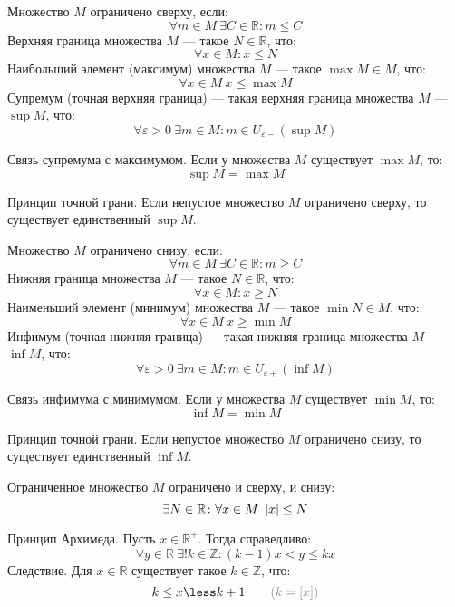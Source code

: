 Множество $M$ {\bold ограничено сверху}, если:
$$\forall m\in M\ \exists C\in\mathbb{R}\colon m\leq C$$
{\bold Верхняя граница} множества $M$ --- такое $N\in\mathbb{R}$, что:
$$\forall x\in M\colon x\leq N$$
{\bold Наибольший элемент} {\ital (максимум)} множества $M$ --- такое $\max M\in M$, что:
$$\forall x\in M\ x\leq\max M$$
{\bold Супремум} {\ital (точная верхняя граница)} --- такая верхняя граница множества $M$ --- $\sup M$, что:
$$\forall\varepsilon\greater 0\ \exists m\in M\colon m\in U_{\varepsilon-}(\sup M)$$
\begin{theorem}
{\bold Связь супремума с максимумом.} Если у множества $M$ существует $\max M$, то:
$$\sup M=\max M$$ 
\end{theorem}
\begin{theorem}
{\bold Принцип точной грани.} Если непустое множество $M$ ограничено сверху, то существует {\ital единственный} $\sup M$.
\end{theorem}
Множество $M$ {\bold ограничено снизу}, если:
$$\forall m\in M\ \exists C\in\mathbb{R}\colon m\geq C$$
{\bold Нижняя граница} множества $M$ --- такое $N\in\mathbb{R}$, что:
$$\forall x\in M\colon x\geq N$$
{\bold Наименьший элемент} {\ital (минимум)} множества $M$ --- такое $\min N\in M$, что:
$$\forall x\in M\ x\geq\min M$$
{\bold Инфимум} {\ital (точная нижняя граница)} --- такая нижняя граница множества $M$ --- $\inf M$, что:
$$\forall\varepsilon\greater 0\ \exists m\in M\colon m\in U_{\varepsilon+}(\inf M)$$
\begin{theorem}
{\bold Связь инфимума с минимумом.} Если у множества $M$ существует $\min M$, то:
$$\inf M=\min M$$ 
\end{theorem}
\begin{theorem}
{\bold Принцип точной грани.} Если непустое множество $M$ ограничено снизу, то существует {\ital единственный} $\inf M$.
\end{theorem}
{\bold Ограниченное} множество $M$ ограничено {\ital и сверху, и снизу}:
$$\exists N\in\mathbb{R}\colon\forall x\in M\ \abs{x}\leq N$$
\begin{theorem}
{\bold Принцип Архимеда.} Пусть $x\in\mathbb{R}^+$. Тогда справедливо:
$$\forall y\in\mathbb{R}\ \exists!k\in\mathbb{Z}\colon (k-1)x\less y\leq kx$$
{\bold Следствие.} Для $x\in\mathbb{R}$ существует такое $k\in\mathbb{Z}$, что:
$$k\leq x\less k+1\qquad{\color{desc} (k=[x])}$$
\end{theorem}

